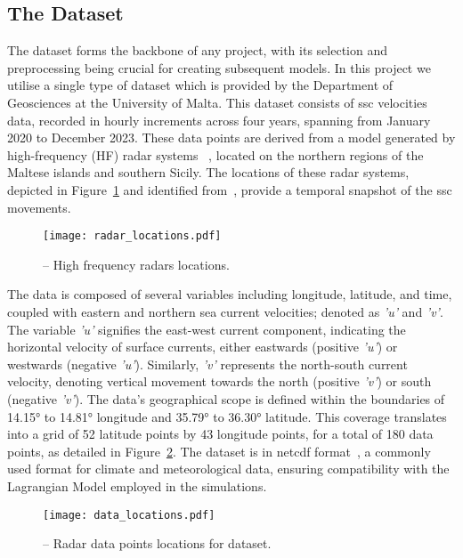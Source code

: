 \subsection{The Dataset}
\label{subsec:2.1.2}
The dataset forms the backbone of any project, with its selection and preprocessing being crucial for creating subsequent models. In this project we utilise a single type of dataset which is provided by the Department of Geosciences at the University of Malta. This dataset consists of \acrshort{ssc} velocities data, recorded in hourly increments across four years, spanning from January 2020 to December 2023. These data points are derived from a model generated by high-frequency (HF) radar systems ~\cite{11}, located on the northern regions of the Maltese islands and southern Sicily. The locations of these radar systems, depicted in Figure~\ref{fig_2.1} and identified from~\cite{12}, provide a temporal snapshot of the \acrshort{ssc} movements.  

\begin{figure}[htbp]
    \centering
    \texttt{[image: radar\_locations.pdf]}
    \caption[High frequency radars locations.]{-- High frequency radars locations.\label{fig_2.1}}
\end{figure}

The data is composed of several variables including longitude, latitude, and time, coupled with eastern and northern sea current velocities; denoted as \textit{'u'} and \textit{'v'}. The variable \textit{'u'} signifies the east-west current component, indicating the horizontal velocity of surface currents, either eastwards (positive \textit{'u'}) or westwards (negative \textit{'u'}). Similarly, \textit{'v'} represents the north-south current velocity, denoting vertical movement towards the north (positive \textit{'v'}) or south (negative \textit{'v'}). The data's geographical scope is defined within the boundaries of 14.15° to 14.81° longitude and 35.79° to 36.30° latitude. This coverage translates into a grid of 52 latitude points by 43 longitude points, for a total of 180 data points, as detailed in Figure~\ref{fig_2.2}. The dataset is in \acrshort{netcdf} format~\cite{13}, a commonly used format for climate and meteorological data, ensuring compatibility with the Lagrangian Model employed in the simulations.

\begin{figure}[htbp]
    \centering
    \texttt{[image: data\_locations.pdf]}
    \caption[Radar data points locations for dataset.]{-- Radar data points locations for dataset.\label{fig_2.2}}
\end{figure}

